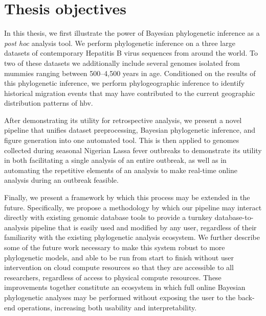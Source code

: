 \section{Thesis objectives}

In this thesis, we first illustrate the power of Bayesian phylogenetic inference as a \textit{post hoc} analysis tool.
We perform phylogenetic inference on a three large datasets of contemporary Hepatitis B virus sequences from around the world.
To two of these datasets we additionally include several genomes isolated from mummies ranging between 500--4,500 years in age.
Conditioned on the results of this phylogenetic inference, we perform phylogeographic inference to identify historical migration events that may have contributed to the current geographic distribution patterns of \gls{hbv}. %

After demonstrating its utility for retrospective analysis, we present a novel pipeline that unifies dataset preprocessing, Bayesian phylogenetic inference, and figure generation into one automated tool.
This is then applied to genomes collected during seasonal Nigerian Lassa fever outbreaks to demonstrate its utility in both facilitating a single analysis of an entire outbreak, as well as in automating the repetitive elements of an analysis to make real-time online analysis during an outbreak feasible. %

Finally, we present a framework by which this process may be extended in the future. %
Specifically, we propose a methodology by which our pipeline may interact directly with existing genomic database tools to provide a turnkey database-to-analysis pipeline that is easily used and modified by any user, regardless of their familiarity with the existing phylogenetic analysis ecosystem.
We further describe some of the future work necessary to make this system robust to more phylogenetic models, and able to be run from start to finish without user intervention on cloud compute resources so that they are accessible to all researchers, regardless of access to physical compute resources.
These improvements together constitute an ecosystem in which full online Bayesian phylogenetic analyses may be performed without exposing the user to the back-end operations, increasing both usability and interpretability.




\cleardoublepage

